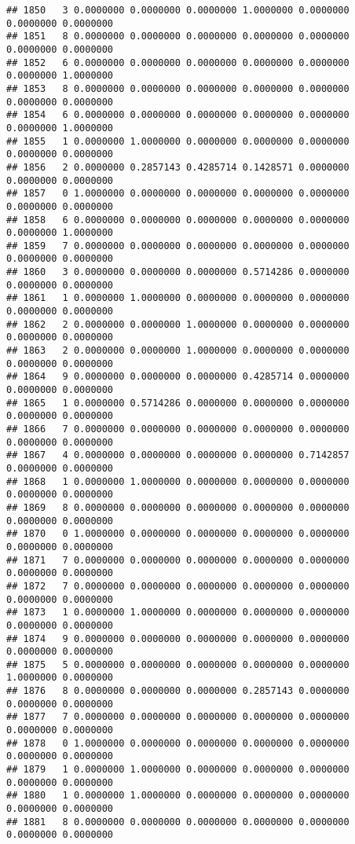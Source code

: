 \documentclass[
]{article}
\begin{document}
\begin{verbatim}
## 1850   3 0.0000000 0.0000000 0.0000000 1.0000000 0.0000000 0.0000000 0.0000000
## 1851   8 0.0000000 0.0000000 0.0000000 0.0000000 0.0000000 0.0000000 0.0000000
## 1852   6 0.0000000 0.0000000 0.0000000 0.0000000 0.0000000 0.0000000 1.0000000
## 1853   8 0.0000000 0.0000000 0.0000000 0.0000000 0.0000000 0.0000000 0.0000000
## 1854   6 0.0000000 0.0000000 0.0000000 0.0000000 0.0000000 0.0000000 1.0000000
## 1855   1 0.0000000 1.0000000 0.0000000 0.0000000 0.0000000 0.0000000 0.0000000
## 1856   2 0.0000000 0.2857143 0.4285714 0.1428571 0.0000000 0.0000000 0.0000000
## 1857   0 1.0000000 0.0000000 0.0000000 0.0000000 0.0000000 0.0000000 0.0000000
## 1858   6 0.0000000 0.0000000 0.0000000 0.0000000 0.0000000 0.0000000 1.0000000
## 1859   7 0.0000000 0.0000000 0.0000000 0.0000000 0.0000000 0.0000000 0.0000000
## 1860   3 0.0000000 0.0000000 0.0000000 0.5714286 0.0000000 0.0000000 0.0000000
## 1861   1 0.0000000 1.0000000 0.0000000 0.0000000 0.0000000 0.0000000 0.0000000
## 1862   2 0.0000000 0.0000000 1.0000000 0.0000000 0.0000000 0.0000000 0.0000000
## 1863   2 0.0000000 0.0000000 1.0000000 0.0000000 0.0000000 0.0000000 0.0000000
## 1864   9 0.0000000 0.0000000 0.0000000 0.4285714 0.0000000 0.0000000 0.0000000
## 1865   1 0.0000000 0.5714286 0.0000000 0.0000000 0.0000000 0.0000000 0.0000000
## 1866   7 0.0000000 0.0000000 0.0000000 0.0000000 0.0000000 0.0000000 0.0000000
## 1867   4 0.0000000 0.0000000 0.0000000 0.0000000 0.7142857 0.0000000 0.0000000
## 1868   1 0.0000000 1.0000000 0.0000000 0.0000000 0.0000000 0.0000000 0.0000000
## 1869   8 0.0000000 0.0000000 0.0000000 0.0000000 0.0000000 0.0000000 0.0000000
## 1870   0 1.0000000 0.0000000 0.0000000 0.0000000 0.0000000 0.0000000 0.0000000
## 1871   7 0.0000000 0.0000000 0.0000000 0.0000000 0.0000000 0.0000000 0.0000000
## 1872   7 0.0000000 0.0000000 0.0000000 0.0000000 0.0000000 0.0000000 0.0000000
## 1873   1 0.0000000 1.0000000 0.0000000 0.0000000 0.0000000 0.0000000 0.0000000
## 1874   9 0.0000000 0.0000000 0.0000000 0.0000000 0.0000000 0.0000000 0.0000000
## 1875   5 0.0000000 0.0000000 0.0000000 0.0000000 0.0000000 1.0000000 0.0000000
## 1876   8 0.0000000 0.0000000 0.0000000 0.2857143 0.0000000 0.0000000 0.0000000
## 1877   7 0.0000000 0.0000000 0.0000000 0.0000000 0.0000000 0.0000000 0.0000000
## 1878   0 1.0000000 0.0000000 0.0000000 0.0000000 0.0000000 0.0000000 0.0000000
## 1879   1 0.0000000 1.0000000 0.0000000 0.0000000 0.0000000 0.0000000 0.0000000
## 1880   1 0.0000000 1.0000000 0.0000000 0.0000000 0.0000000 0.0000000 0.0000000
## 1881   8 0.0000000 0.0000000 0.0000000 0.0000000 0.0000000 0.0000000 0.0000000

\end{verbatim}
\end{document}
